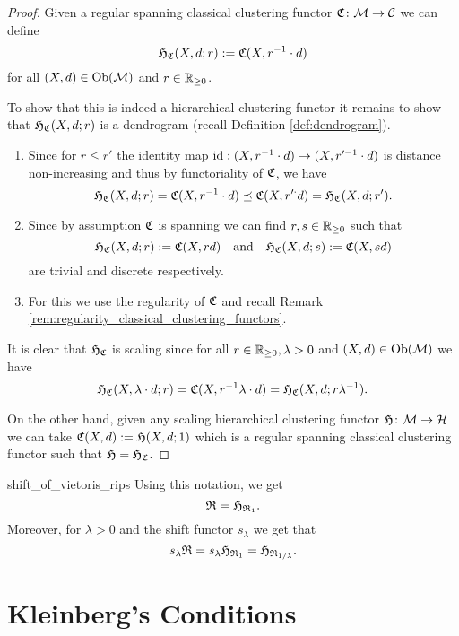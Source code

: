 \begin{proof}
Given a regular spanning classical clustering functor $\mathfrak{C}\colon \mathcal{M} \to \mathcal{C}$ we can define
$$
\mathfrak{H}_{\mathfrak{C}}(X,d; r) := \mathfrak{C}(X, r^{-1} \cdot d)
$$
for all $(X,d) \in \mathrm {Ob}(\mathcal{M})$ and $r \in \mathbb R_{\geq0}$.

To show that this is indeed a hierarchical clustering functor it remains to show that $\mathfrak{H}_{\mathfrak{C}}(X,d;r)$ is a dendrogram (recall Definition \ref{def:dendrogram}).
\begin{enumerate}
    \item Since for $r \leq r'$ the identity map $\mathrm{id}: (X, r^{-1} \cdot d) \to (X, r'^{-1} \cdot d)$ is distance non-increasing and thus by functoriality of $\mathfrak{C}$, we have
    $$
    \mathfrak{H}_{\mathfrak{C}}(X,d;r) = \mathfrak{C}(X, r^{-1} \cdot d) \preceq \mathfrak{C}(X, r'^ \cdot d) = \mathfrak{H}_{\mathfrak{C}}(X,d;r').
    $$
    
    \item Since by assumption $\mathfrak{C}$ is spanning we can find $r,s \in \mathbb R_{\geq0}$ such that
    $$
    \mathfrak{H}_{\mathfrak{C}}(X,d;r) := \mathfrak{C}(X, r d) \quad \text{and} \quad \mathfrak{H}_{\mathfrak{C}}(X,d;s) := \mathfrak{C}(X, s d)
    $$
    are trivial and discrete respectively.

    \item For this we use the regularity of $\mathfrak{C}$ and recall Remark \ref{rem:regularity_classical_clustering_functors}.
\end{enumerate}

It is clear that $\mathfrak{H}_{\mathfrak{C}}$ is scaling since for all $r \in \mathbb R_{\geq0},\lambda > 0$ and $(X,d) \in \mathrm {Ob}(\mathcal{M})$ we have
$$
\mathfrak{H}_{\mathfrak{C}}(X, \lambda \cdot d; r) = \mathfrak{C}(X, r^{-1} \lambda \cdot d) = \mathfrak{H}_{\mathfrak{C}}(X,d;r \lambda^{-1}).
$$ 

On the other hand, given any scaling hierarchical clustering functor $\mathfrak{H}\colon \mathcal{M} \to \mathcal{H}$ we can take $\mathfrak{C}(X,d) := \mathfrak{H}(X,d; 1)$ which is a regular spanning classical clustering functor such that $\mathfrak{H} = \mathfrak{H}_{\mathfrak{C}}$.
\end{proof}

\begin{example}{}{shift_of_vietoris_rips}
Using this notation, we get
$$
\mathfrak{R} = \mathfrak{H}_{\mathfrak{R}_1}.
$$
Moreover, for $\lambda > 0$ and the shift functor $s_\lambda$ we get that
$$
s_\lambda \mathfrak{R} = s_\lambda \mathfrak{H}_{\mathfrak{R}_1} = \mathfrak{H}_{\mathfrak{R}_{1/\lambda}}.
$$
\end{example}

\section{Kleinberg's Conditions}


